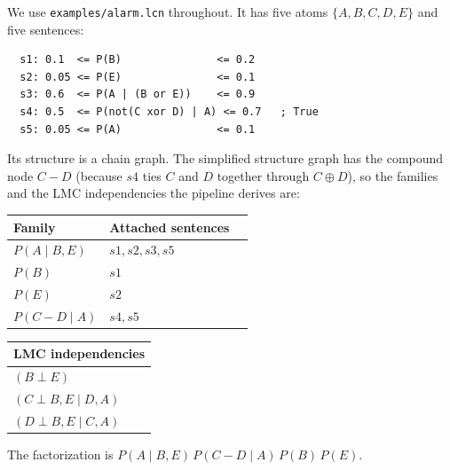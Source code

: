 \documentclass[11pt]{article}
\begin{document}
We use \texttt{examples/alarm.lcn} throughout. It has five atoms $\{A,B,C,D,E\}$ and five
sentences:
\begin{verbatim}
  s1: 0.1  <= P(B)               <= 0.2
  s2: 0.05 <= P(E)               <= 0.1
  s3: 0.6  <= P(A | (B or E))    <= 0.9
  s4: 0.5  <= P(not(C xor D) | A) <= 0.7   ; True
  s5: 0.05 <= P(A)               <= 0.1
\end{verbatim}
Its structure is a chain graph. The simplified structure graph has the compound node
$C\!-\!D$ (because $s4$ ties $C$ and $D$ together through $C \oplus D$), so the families
and the LMC independencies the pipeline derives are:
\begin{center}
\begin{tabular}{lll}
  \toprule
  Family & Attached sentences & \\
  \midrule
  $P(A \mid B,E)$   & $s1,s2,s3,s5$ & \\
  $P(B)$            & $s1$ & \\
  $P(E)$            & $s2$ & \\
  $P(C\!-\!D \mid A)$ & $s4,s5$ & \\
  \bottomrule
\end{tabular}
\qquad
\begin{tabular}{l}
  \toprule
  LMC independencies \\
  \midrule
  $(B \perp E)$ \\
  $(C \perp B,E \mid D,A)$ \\
  $(D \perp B,E \mid C,A)$ \\
  \bottomrule
\end{tabular}
\end{center}
The factorization is $P(A\mid B,E)\,P(C\!-\!D\mid A)\,P(B)\,P(E)$.
\end{document}
